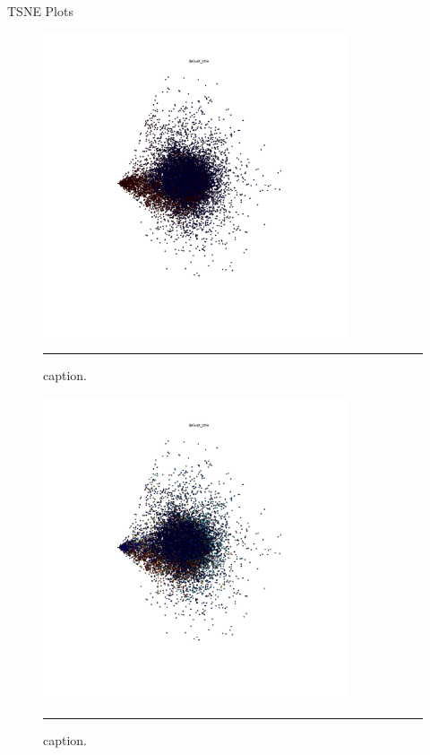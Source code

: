TSNE Plots

\begin{figure}[htbp]
  \centering
    \includegraphics[width = 0.8\textwidth]{./Figures/binary_perp0.png}
    \rule{35em}{0.5pt}
  \caption[Binary TSNE]{caption.}
  \label{fig:}
\end{figure}

\begin{figure}[htbp]
  \centering
    \includegraphics[width = 0.8\textwidth]{./Figures/10Classes_perp0.png}
    \rule{35em}{0.5pt}
  \caption[Multi-class TSNE]{caption.}
  \label{fig:}
\end{figure}



